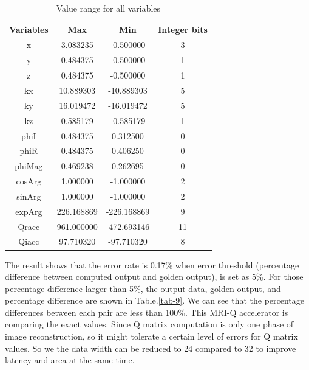 \documentclass{sig-alternate}
\begin{document}
\begin{table}[ht!]
    \centering
    \begin{tabular}{c|c|c|c}
    \hline \hline
   Variables &       Max&    Min& Integer bits\\
   \hline \hline
 x&     3.083235        &-0.500000& 3 \\
 y&     0.484375        &-0.500000& 1 \\
 z&     0.484375        &-0.500000& 1 \\
 kx&    10.889303       &-10.889303& 5 \\
 ky&    16.019472       &-16.019472& 5 \\
 kz&    0.585179        &-0.585179& 1\\
 phiI   &0.484375       &0.312500& 0 \\
 phiR   &0.484375       &0.406250& 0 \\
 phiMag &0.469238       &0.262695& 0 \\
 cosArg&        1.000000        &-1.000000& 2\\
 sinArg &1.000000       &-1.000000& 2 \\
 \hline
 expArg &226.168869     &-226.168869& 9 \\
 Qracc  &961.000000     &-472.693146& 11 \\
 Qiacc  &97.710320      &-97.710320& 8 \\
\hline \hline
    \end{tabular}
    \caption{Value range for all variables}
    \label{tab-8}
\end{table}

The result shows that the error rate is 0.17\% when error threshold (percentage difference between computed output and golden output), is set as 5\%. For those percentage difference larger than 5\%, the output data, golden output, and percentage difference are shown in Table.\ref{tab-9}. We can see that the percentage differences between each pair are less than 100\%. This MRI-Q accelerator is comparing the exact values. Since Q matrix computation is only one phase of image reconstruction, so it might tolerate a certain level of errors for Q matrix values. So we the data width can be reduced to 24 compared to 32 to improve latency and area at the same time.
\end{document}

